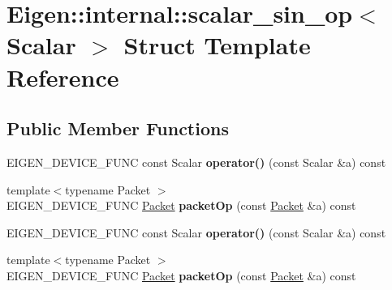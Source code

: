 \hypertarget{struct_eigen_1_1internal_1_1scalar__sin__op}{}\section{Eigen\+:\+:internal\+:\+:scalar\+\_\+sin\+\_\+op$<$ Scalar $>$ Struct Template Reference}
\label{struct_eigen_1_1internal_1_1scalar__sin__op}
\subsection*{Public Member Functions}
\begin{DoxyCompactItemize}
\item 
\mbox{\label{struct_eigen_1_1internal_1_1scalar__sin__op_aefe006b7c3a5a37389e4991c29bbde41}} 
E\+I\+G\+E\+N\+\_\+\+D\+E\+V\+I\+C\+E\+\_\+\+F\+U\+NC const Scalar {\bfseries operator()} (const Scalar \&a) const
\item 
\mbox{\label{struct_eigen_1_1internal_1_1scalar__sin__op_ae854606b365690e59e82e853191d28cd}} 
{\footnotesize template$<$typename Packet $>$ }\\E\+I\+G\+E\+N\+\_\+\+D\+E\+V\+I\+C\+E\+\_\+\+F\+U\+NC \hyperlink{union_eigen_1_1internal_1_1_packet}{Packet} {\bfseries packet\+Op} (const \hyperlink{union_eigen_1_1internal_1_1_packet}{Packet} \&a) const
\item 
\mbox{\label{struct_eigen_1_1internal_1_1scalar__sin__op_aefe006b7c3a5a37389e4991c29bbde41}} 
E\+I\+G\+E\+N\+\_\+\+D\+E\+V\+I\+C\+E\+\_\+\+F\+U\+NC const Scalar {\bfseries operator()} (const Scalar \&a) const
\item 
\mbox{\label{struct_eigen_1_1internal_1_1scalar__sin__op_ae854606b365690e59e82e853191d28cd}} 
{\footnotesize template$<$typename Packet $>$ }\\E\+I\+G\+E\+N\+\_\+\+D\+E\+V\+I\+C\+E\+\_\+\+F\+U\+NC \hyperlink{union_eigen_1_1internal_1_1_packet}{Packet} {\bfseries packet\+Op} (const \hyperlink{union_eigen_1_1internal_1_1_packet}{Packet} \&a) const
\end{DoxyCompactItemize}


